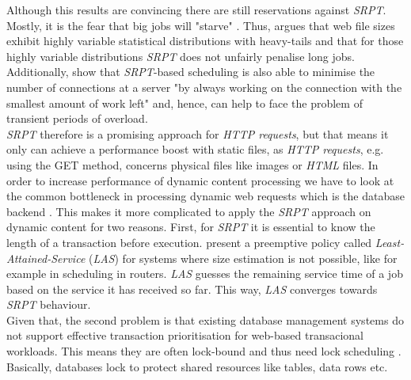 \documentclass[
  a4paper,               %
  twoside,               %
  headings=small,        %
  DIV=12,                %
  BCOR=1cm,              %
  headinclude=true,      %
  footinclude=true,      %
  numbers=noenddot,      %
  11pt]{scrartcl}        %
\begin{document}
Although this results are convincing there are still reservations against \textit{SRPT}. Mostly, it is the fear that big jobs will "starve" \cite{schorederSchedule}. Thus, \cite{schorederSchedule} argues that web file sizes exhibit highly variable statistical distributions with heavy-tails and that for those highly variable distributions \textit{SRPT} does not unfairly penalise long jobs. Additionally, \cite{schorederSchedule} show that \textit{SRPT}-based scheduling is also able to minimise the number of connections at a server "by always working on the connection with the smallest amount of work left" \cite{schorederSchedule} and, hence, can help to face the problem of transient periods of overload.\\
\textit{SRPT} therefore is a promising approach for \textit{HTTP requests}, but that means it only can achieve a performance boost with static files, as \textit{HTTP requests}, e.g. using the GET method, concerns physical files like images or \textit{HTML} files. In order to increase performance of dynamic content processing we have to look at the common bottleneck in processing dynamic web requests which is the database backend \cite{McWherter}. This makes it more complicated to apply the \textit{SRPT} approach on dynamic content for two reasons.  First, for \textit{SRPT} it is essential to know the length of a transaction before execution. \cite{schorederSchedule} present a preemptive policy called \emph{Least-Attained-Service} (\emph{LAS}) for systems where size estimation is not possible, like for example in scheduling in routers. \textit{LAS} guesses the remaining service time of a job based on the service it has received so far. This way, \textit{LAS} converges towards \textit{SRPT} behaviour.\\
Given that, the second problem is that existing database management systems do not support effective transaction prioritisation for web-based transacional workloads. This means they are often lock-bound and thus need lock scheduling \cite{McWherter}. Basically, databases lock to protect shared resources like tables, data rows etc.\\
\end{document}
